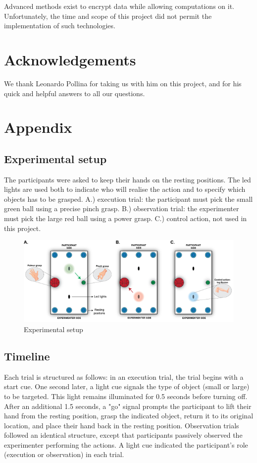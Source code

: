 \documentclass[10pt,conference,compsocconf]{IEEEtran}
\begin{document}
Advanced methods exist to encrypt data while allowing computations on it\cite{app11167360}. Unfortunately, the time and scope of this project did not permit the implementation of such technologies.


\section*{Acknowledgements}
We thank Leonardo Pollina for taking us with him on this project, and for his quick and helpful answers to all our questions.
\section{Appendix}
\subsection{Experimental setup}
The participants were asked to keep their hands on the resting positions. The led lights are used both to indicate who will realise the action and to specify which objects has to be grasped. A.) execution trial: the participant must pick the small green ball using a precise pinch grasp. B.) observation trial: the experimenter must pick the large red ball using a power grasp. C.) control action, not used in this project.

\begin{figure}[h!]
    \center
    \includegraphics[width=\linewidth]{images/2024-12-11-13-41-23.png}
    \caption{Experimental setup}
\end{figure}
\FloatBarrier

\subsection{Timeline}
\label{subsec:timeline}
Each trial is structured as follows: in an execution trial, the trial begins with a start cue. One second later, a light cue signals the type of object (small or large) to be targeted. This light remains illuminated for 0.5 seconds before turning off. After an additional 1.5 seconds, a "go" signal prompts the participant to lift their hand from the resting position, grasp the indicated object, return it to its original location, and place their hand back in the resting position. Observation trials followed an identical structure, except that participants passively observed the experimenter performing the actions. A light cue indicated the participant's role (execution or observation) in each trial.
\end{document}
